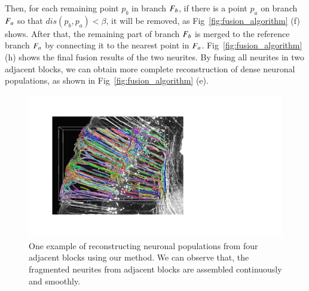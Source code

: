 Then, for each remaining point $p_b$ in branch $F_b$, if there is a point $p_a$ on branch $F_a$ so that $dis(p_b,p_a)<\beta$, it will be removed, as Fig~\ref{fig:fusion_algorithm} (f) shows. 
%
After that, the remaining part of branch $F_b$ is merged to the reference branch $F_a$ by connecting it to the nearest point in $F_a$.
Fig~\ref{fig:fusion_algorithm} (h) shows the final fusion results of the two neurites. 
By fusing all neurites in two adjacent blocks, we can obtain more complete reconstruction of dense neuronal populations, as shown in Fig~\ref{fig:fusion_algorithm} (e).
 
\begin{figure}[t]
	\centering
	\includegraphics[width=1\columnwidth]{./Illustrations/trace_four_blocks2.pdf}
	\caption{One example of reconstructing neuronal populations from four adjacent blocks using our method. We can observe that, the fragmented neurites from adjacent blocks are assembled continuously and smoothly.}
	\label{fig:reconstruct_blocks}
\end{figure}
 

